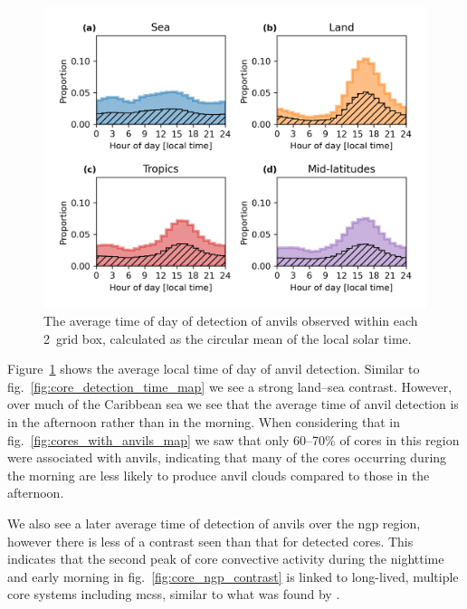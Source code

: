 \begin{figure}[tp]
    \centering
    \includegraphics[width=\textwidth]{figures/chapter2_26.png}
    \caption[
    The average time of detection of anvils
    ]{
    The average time of day of detection of anvils observed within each 2\textdegree\ grid box, calculated as the circular mean of the local solar time.
    }
    \label{fig:anvil_detection_time_map}
\end{figure}

Figure~\ref{fig:anvil_detection_time_map} shows the average local time of day of anvil detection.
Similar to fig.~\ref{fig:core_detection_time_map} we see a strong land--sea contrast.
However, over much of the Caribbean sea we see that the average time of anvil detection is in the afternoon rather than in the morning.
When considering that in fig.~\ref{fig:cores_with_anvils_map} we saw that only 60--70\% of cores in this region were associated with anvils, indicating that many of the cores occurring during the morning are less likely to produce anvil clouds compared to those in the afternoon.

We also see a later average time of detection of anvils over the \acrshort{ngp} region, however there is less of a contrast seen than that for detected cores.
This indicates that the second peak of core convective activity during the nighttime and early morning in fig.~\ref{fig:core_ngp_contrast} is linked to long-lived, multiple core systems including \acrshort{mcs}s, similar to what was found by \citet{feng_spatiotemporal_2019}.


